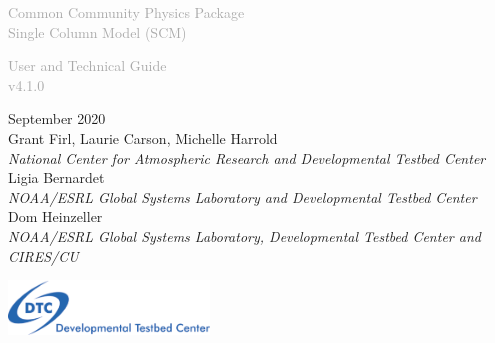 \begin{titlepage}
\renewcommand{\thefootnote}{\fnsymbol{footnote}}

\vspace*{1em}
\noindent

\begin{center}
\textcolor{darkgray}{\bigsf Common Community Physics Package\\[0.5ex] Single Column Model (SCM)}
\vspace*{1em}\par

\textcolor{darkgray}{\bigst User and Technical Guide\\[0.5ex] v4.1.0}
\vspace*{1em}\par

\large{September 2020}\\

Grant Firl, Laurie Carson, Michelle Harrold\\
\textit{\small{National Center for Atmospheric Research and Developmental Testbed Center}}\\[4em]

Ligia Bernardet\\
\textit{\small{NOAA/ESRL Global Systems Laboratory and Developmental Testbed Center}}\\[4em]

Dom Heinzeller\\
\textit{\small{NOAA/ESRL Global Systems Laboratory, Developmental Testbed Center and CIRES/CU}}\\[4em]

\vspace{4em}

\includegraphics[width=0.4\textwidth]{images/dtc_logo.png}\\[2em]

\end{center}
\end{titlepage}
\pagebreak{}
